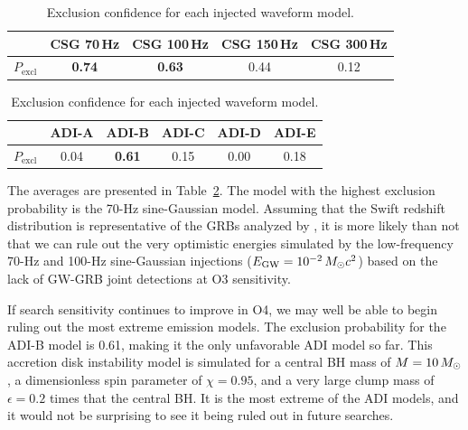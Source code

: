 \begin{table}[h]
  \hspace{0.5cm}
  \caption
  {\label{tab:grb-o3b-model-exclusion} Exclusion confidence for each injected waveform model.}
  \begin{tabular}{c c c c c}
    \hline
    \hline
    \rule{0pt}{4ex}
    & CSG 70\,Hz & CSG 100\,Hz & CSG 150\,Hz & CSG 300\,Hz \\
    \hline
    \rule[-2ex]{0pt}{4ex}
		$P_{\text{excl}}$ & \textbf{0.74} & \textbf{0.63} & 0.44 & 0.12
  \end{tabular}
  \begin{tabular}{c c c c c c}
    \hline
    \hline
    \rule{0pt}{4ex}
    & ADI-A & ADI-B & ADI-C & ADI-D & ADI-E \\
    \hline
    \rule[-2ex]{0pt}{4ex}
    $P_{\text{excl}}$ & 0.04 & \textbf{0.61} & 0.15 & 0.00 & 0.18 \\
    \hline
  \end{tabular}
\end{table}

The averages are presented in Table~\ref{tab:grb-o3b-model-exclusion}.
The model with the highest exclusion probability is the 70-Hz sine-Gaussian model.
Assuming that the Swift redshift distribution is representative of the GRBs analyzed by \xpip, it is more likely than not that we can rule out the very optimistic energies simulated by the low-frequency 70-Hz and 100-Hz sine-Gaussian injections ($E_{\text{GW}} = 10^{-2}\,M_{\odot} c^2$) based on the lack of GW-GRB joint detections at O3 sensitivity.

If search sensitivity continues to improve in \ac{O4}, we may well be able to begin ruling out the most extreme emission models.
The exclusion probability for the ADI-B model is 0.61, making it the only unfavorable ADI model so far.
This accretion disk instability model is simulated for a central \ac{BH} mass of $M=10\,M_{\odot}$, a dimensionless spin parameter of $\chi=0.95$, and a very large clump mass of $\epsilon=0.2$ times that the central \ac{BH}.
It is the most extreme of the ADI models, and it would not be surprising to see it being ruled out in future searches.
